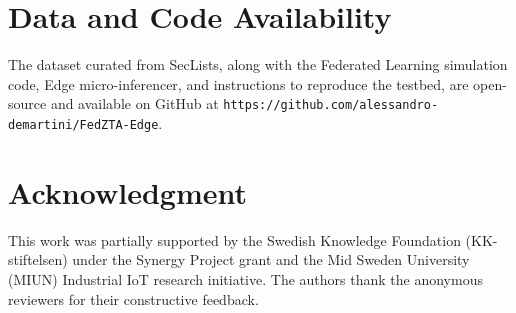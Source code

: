 \documentclass[conference]{IEEEtran}
\begin{document}
\section*{Data and Code Availability}
The dataset curated from SecLists, along with the Federated Learning simulation code, Edge micro-inferencer, and instructions to reproduce the testbed, are open-source and available on GitHub at \texttt{https://github.com/alessandro-demartini/FedZTA-Edge}.

\section*{Acknowledgment}
This work was partially supported by the Swedish Knowledge Foundation (KK-stiftelsen) under the Synergy Project grant and the Mid Sweden University (MIUN) Industrial IoT research initiative. The authors thank the anonymous reviewers for their constructive feedback.
\end{document}
